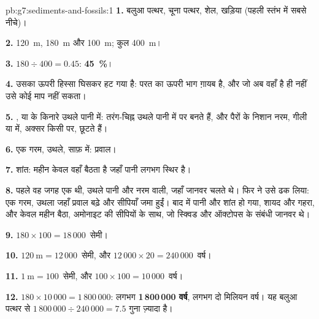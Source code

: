 \begin{solution}{pb:g7:sediments-and-fossils:1}
\textbf{1.} बलुआ पत्थर, चूना पत्थर, शेल, खड़िया (पहली स्तंभ में सबसे
नीचे)।

\textbf{2.} \qty{120}{m}, \qty{180}{m} और \qty{100}{m}; कुल
\qty{400}{m}।

\textbf{3.} $180 \div 400 = 0.45$: \textbf{45~\%}।

\textbf{4.} उसका ऊपरी हिस्सा घिसकर हट गया है: परत का ऊपरी भाग ग़ायब है, और जो अब
वहाँ है ही नहीं उसे कोई माप नहीं सकता।

\textbf{5.} ,  या  के किनारे उथले पानी में: तरंग-चिह्न उथले पानी में 
पर बनते हैं, और पैरों के निशान नरम, गीली  या  में, अक्सर किसी  पर, छूटते
हैं।

\textbf{6.} एक गरम, उथले, साफ़  में: प्रवाल।

\textbf{7.} शांत: महीन  केवल वहाँ बैठता है जहाँ पानी लगभग स्थिर है।

\textbf{8.} पहले वह जगह एक  थी, उथले पानी और नरम  वाली, जहाँ जानवर चलते थे।
फिर  ने उसे ढक लिया: एक गरम, उथला  जहाँ प्रवाल बढ़े और सीपियाँ जमा
हुईं। बाद में पानी और शांत हो गया, शायद और गहरा, और केवल महीन  बैठा,
अमोनाइट की सीपियों के साथ, जो स्क्विड और ऑक्टोपस के संबंधी
जानवर थे।

\textbf{9.} $180 \times 100 = 18\,000$~सेमी।

\textbf{10.} $120~\text{m} = 12\,000$~सेमी, और $12\,000 \times 20 =
240\,000$~वर्ष।

\textbf{11.} $1~\text{m} = 100$~सेमी, और $100 \times 100 = 10\,000$~वर्ष।

\textbf{12.} $180 \times 10\,000 = 1\,800\,000$: लगभग
\textbf{1\,800\,000 वर्ष}, लगभग दो मिलियन वर्ष। यह बलुआ पत्थर से
$1\,800\,000 \div 240\,000 = 7.5$ गुना ज़्यादा है।
\end{solution}
